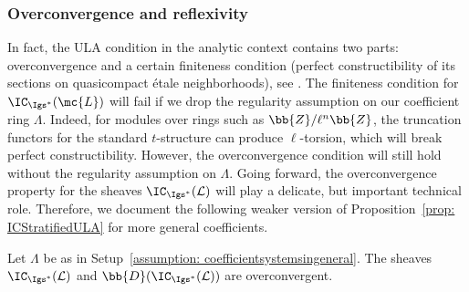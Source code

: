 \documentclass[letterpaper,11pt]{amsart}
\begin{document}
\subsubsection{Overconvergence and reflexivity}
In fact, the ULA condition in the analytic context contains two parts: overconvergence and a certain finiteness condition (perfect constructibility of its sections on quasicompact \'etale neighborhoods), see \cite[Definition IV.2.1]{FSGeomLLC}. The finiteness condition for $\IC_{\Igs^\ast}(\mc{L})$ will fail if we drop the regularity assumption on our coefficient ring $\Lambda$. Indeed, for modules over rings such as $\bb{Z}/\ell^n\bb{Z}$, the truncation functors for the standard $t$-structure can produce $\ell$-torsion, which will break perfect constructibility. However, the overconvergence condition will still hold without the regularity assumption on $\Lambda$. Going forward, the overconvergence property for the sheaves $\IC_{\Igs^{*}}(\mathcal{L})$ will play a delicate, but important technical role. Therefore, we document the following weaker version of Proposition~\ref{prop: ICStratifiedULA} for more general coefficients. 
\begin{proposition}{\label{prop: ICIgsstaroverconvergent}}
Let $\Lambda$ be as in Setup~\ref{assumption: coefficientsystemsingeneral}. The sheaves $\IC_{\Igs^{*}}(\mathcal{L})$ and $\bb{D}(\IC_{\Igs^{*}}(\mathcal{L}))$ are overconvergent.
\end{proposition}
\end{document}
